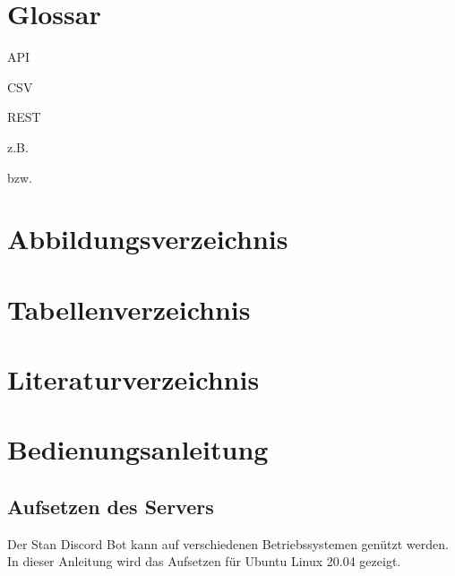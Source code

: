 \documentclass[a4paper, table]{article}
\begin{document}
\newpage
\section{Glossar}

API

CSV

REST

z.B.

bzw.


\section{Abbildungsverzeichnis}
\listoffigures

\section{Tabellenverzeichnis}
\listoftables

\section{Literaturverzeichnis}
\printbibliography

\section{Bedienungsanleitung}

\subsection{Aufsetzen des Servers}

Der Stan Discord Bot kann auf verschiedenen Betriebssystemen genützt werden.
In dieser Anleitung wird das Aufsetzen für Ubuntu Linux 20.04 gezeigt.

\end{document}
